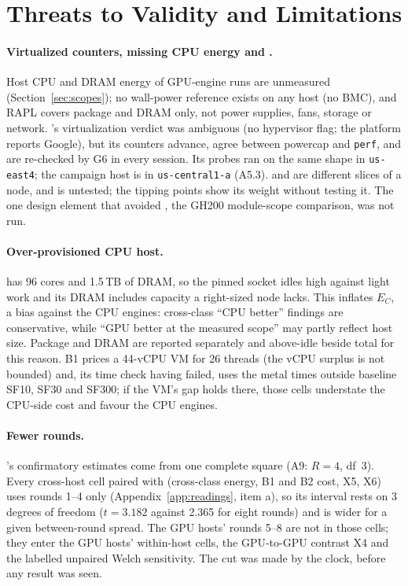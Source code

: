 \documentclass[sigconf]{acmart}
\begin{document}
\section{Threats to Validity and Limitations}
\label{sec:threats}

\paragraph{Virtualized counters, missing CPU energy and \NOne.} Host CPU and DRAM energy of
GPU-engine runs are unmeasured (Section~\ref{sec:scopes}); no wall-power reference exists on any host (no BMC), and RAPL covers package
and DRAM only, not power supplies, fans, storage or network. \CG's virtualization verdict was
ambiguous (no hypervisor flag; the platform reports Google), but its counters advance, agree
between powercap and \texttt{perf}, and are re-checked by G6 in every session. Its probes ran
on the same shape in \texttt{us-east4}; the campaign host is in \texttt{us-central1-a} (A5.3).
 and  are different slices of a node, and \NOne{} is untested; the tipping points show its weight without testing it. The one design element that avoided \NOne, the GH200 module-scope comparison, was not run.

\paragraph{Over-provisioned CPU host.} \CG{} has 96 cores and 1.5\,TB of DRAM, so the pinned
socket idles high against light work and its DRAM includes capacity a right-sized node lacks.
This inflates $E_C$, a bias against the CPU engines: cross-class ``CPU better'' findings are
conservative, while ``GPU better at the measured scope'' may partly reflect host size. Package and
DRAM are reported separately and above-idle beside total for this reason. B1 prices a 44-vCPU VM
for 26 threads (the vCPU surplus is not bounded) and, its time check having failed, uses the metal times
outside baseline SF10, SF30 and SF300; if the VM's gap holds there, those cells understate the CPU-side cost
and favour the CPU engines.

\paragraph{Fewer \CG{} rounds.} \CG's confirmatory estimates come from one complete square (A9: $R = 4$,
df~3). Every cross-host cell paired with \CG{} (cross-class energy, B1 and B2 cost, X5, X6) uses
rounds 1--4 only (Appendix~\ref{app:readings}, item a), so its interval rests on 3 degrees of freedom
($t = 3.182$ against 2.365 for eight rounds) and is wider for a given between-round spread. The GPU hosts'
rounds 5--8 are not in those cells; they enter the GPU hosts' within-host cells, the GPU-to-GPU contrast X4
and the labelled unpaired Welch sensitivity. The cut was made by the clock, before any result was seen.
\end{document}
